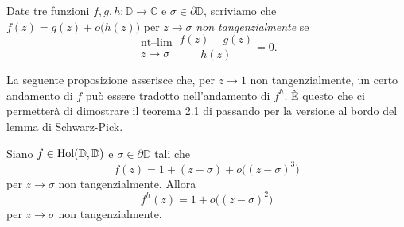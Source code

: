 \begin{defn}
  Date tre funzioni $f,g,h: \mathbb{D} \longrightarrow \mathbb{C}$ e $\sigma \in \partial \mathbb{D}$, scriviamo che $f(z)=g(z)+o\bigl(h(z)\bigr)$ per $z \longrightarrow \sigma$ \textit{non tangenzialmente} se
  $$\substack{\text{nt--lim} \\ z \longrightarrow \sigma} \, \frac{f(z)-g(z)}{h(z)}=0.$$
\end{defn}

La seguente proposizione asserisce che, per $z \longrightarrow 1$ non tangenzialmente, un certo andamento di $f$ può essere tradotto nell'andamento di $f^h$. È questo che ci permetterà di dimostrare il teorema 2.1 di \cite{BK} passando per la versione al bordo del lemma di Schwarz-Pick.

\begin{prop} \label{o^3->o^2}
  Siano $f \in \text{\normalfont{Hol}}(\mathbb{D},\mathbb{D})$ e $\sigma \in \partial\mathbb{D}$ tali che
  \begin{equation} \label{o^3}
    f(z)=1+(z-\sigma)+o\bigl((z-\sigma)^3\bigr)
  \end{equation}
  per $z \longrightarrow \sigma$ non tangenzialmente. Allora
  \begin{equation} \label{o^2}
    f^h(z)=1+o\bigl((z-\sigma)^2\bigr)
  \end{equation}
  per $z \longrightarrow \sigma$ non tangenzialmente.
\end{prop}

